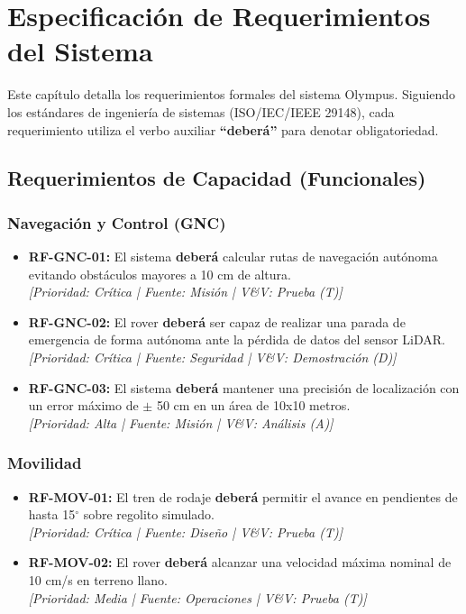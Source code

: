\section{Especificación de Requerimientos del Sistema}

Este capítulo detalla los requerimientos formales del sistema Olympus. Siguiendo los estándares de ingeniería de sistemas (ISO/IEC/IEEE 29148), cada requerimiento utiliza el verbo auxiliar \textbf{``deberá''} para denotar obligatoriedad.

\subsection{Requerimientos de Capacidad (Funcionales)}

\subsubsection{Navegación y Control (GNC)}
\begin{itemize}[label=---]
    \item \textbf{RF-GNC-01:} El sistema \textbf{deberá} calcular rutas de navegación autónoma evitando obstáculos mayores a 10 cm de altura. \\
    \textit{[Prioridad: Crítica | Fuente: Misión | V\&V: Prueba (T)]}
    \item \textbf{RF-GNC-02:} El rover \textbf{deberá} ser capaz de realizar una parada de emergencia de forma autónoma ante la pérdida de datos del sensor LiDAR. \\
    \textit{[Prioridad: Crítica | Fuente: Seguridad | V\&V: Demostración (D)]}
    \item \textbf{RF-GNC-03:} El sistema \textbf{deberá} mantener una precisión de localización con un error máximo de $\pm$ 50 cm en un área de 10x10 metros. \\
    \textit{[Prioridad: Alta | Fuente: Misión | V\&V: Análisis (A)]}
\end{itemize}

\subsubsection{Movilidad}
\begin{itemize}[label=---]
    \item \textbf{RF-MOV-01:} El tren de rodaje \textbf{deberá} permitir el avance en pendientes de hasta 15$^\circ$ sobre regolito simulado. \\
    \textit{[Prioridad: Crítica | Fuente: Diseño | V\&V: Prueba (T)]}
    \item \textbf{RF-MOV-02:} El rover \textbf{deberá} alcanzar una velocidad máxima nominal de 10 cm/s en terreno llano. \\
    \textit{[Prioridad: Media | Fuente: Operaciones | V\&V: Prueba (T)]}
\end{itemize}


